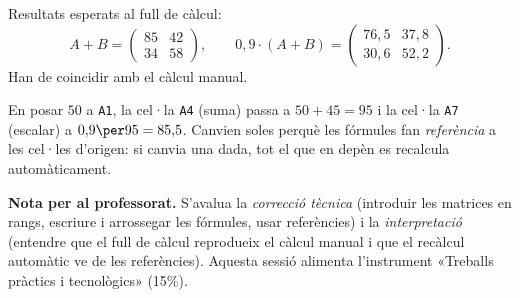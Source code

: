 \begin{solucions}
\begin{sollist}
  \item Resultats esperats al full de càlcul:
        \[ A+B=\begin{pmatrix} 85 & 42 \\ 34 & 58 \end{pmatrix},\qquad
           0{,}9\cdot(A+B)=\begin{pmatrix} 76{,}5 & 37{,}8 \\ 30{,}6 & 52{,}2 \end{pmatrix}. \]
        Han de coincidir amb el càlcul manual.
  \item En posar $50$ a \texttt{A1}, la cel·la \texttt{A4} (suma) passa a
        $50+45=95$ i la cel·la \texttt{A7} (escalar) a $0{,}9\per 95=85{,}5$.
        Canvien soles perquè les fórmules fan \emph{referència} a les cel·les
        d'origen: si canvia una dada, tot el que en depèn es recalcula
        automàticament.
\end{sollist}

\noindent\textbf{Nota per al professorat.} S'avalua la \emph{correcció tècnica}
(introduir les matrices en rangs, escriure i arrossegar les fórmules, usar
referències) i la \emph{interpretació} (entendre que el full de càlcul reprodueix
el càlcul manual i que el recàlcul automàtic ve de les referències). Aquesta
sessió alimenta l'instrument «Treballs pràctics i tecnològics» (15\%).
\end{solucions}
